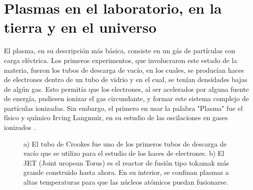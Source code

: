 \documentclass[../main.tex]{subfiles}
\begin{document}
\section{Plasmas en el laboratorio, en la tierra y en el universo}

El plasma, en su descripción más básica, consiste en un gás de partículas con carga eléctrica. Los primeros experimentos, que involucraron este estado de la materia, fueron los tubos de descarga de vacío, en los cuales, se producían haces de electrones dentro de un tubo de vidrio y en el cual, se tenían densidades bajas de algún gas. Esto permitía que los electrones, al ser acelerados por alguna fuente de energía, pudiesen ionizar el gas circundante, y formar este sistema complejo de partículas ionizadas. Sin embargo, el primero en usar la palabra "Plasma" fue el físico y químico Irving Langmuir, en su estudio de las oscilaciones en gases ionizados \cite{langmuir1928oscillations}. \\

    \begin{figure}[hbtp]
        \caption{a) El tubo de Crookes fue uno de los primeros tubos de descarga de vacío que se utilizo para el estudio de los haces de electrones. b) El JET (Joint uropean Torus) es el reactor de fusión tipo tokamak más grande construido hasta ahora. En su interior, se confinan plasmas a altas temperaturas para que las núcleos atómicos puedan fusionarse. } \label{fig:cap1}
    \end{figure}
\end{document}
